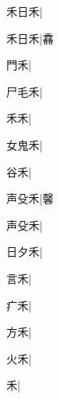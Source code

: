 \begin{multicols}{2}
{{\cjk{}禾日禾}\mktsJzrVerticalBar{}{\cjk{}{\cnsym{}　}{\cnsym{}　}{\cnsym{}　}}|{}\par
{\cjk{}禾日禾}|{\cjk{}馫}\par
{\cjk{}{\cnsym{}　}門禾}\mktsJzrVerticalBar{}{\cjk{}{\cnsym{}　}{\cnsym{}　}{\cnsym{}　}}|{}\par
{\cjk{}尸毛禾}\mktsJzrVerticalBar{}{\cjk{}{\cnsym{}　}{\cnsym{}　}{\cnsym{}　}}|{}\par
{\cjk{}{\cnsym{}　}禾禾}\mktsJzrVerticalBar{}{\cjk{}{\cnsym{}　}{\cnsym{}　}{\cnsym{}　}}|{}\par
{\cjk{}女鬼禾}|{}\par
{\cjk{}{\cnsym{}　}谷禾}\mktsJzrVerticalBar{}{\cjk{}{\cnsym{}　}{\cnsym{}　}{\cnsym{}　}}|{}\par
{\cjk{}声殳禾}\mktsJzrVerticalBar{}{\cjk{}{\cnsym{}　}{\cnsym{}　}{\cnsym{}　}}|{\cjk{}馨}\par
{\cjk{}声殳禾}|{}\par
{\cjk{}日夕禾}|{}\par
{\cjk{}{\cnsym{}　}言禾}\mktsJzrVerticalBar{}{\cjk{}{\cnsym{}　}{\cnsym{}　}{\cnsym{}　}}|{}\par
{\cjk{}{\cnsym{}　}疒禾}\mktsJzrVerticalBar{}{\cjk{}{\cnsym{}　}{\cnsym{}　}{\cnsym{}　}}|{}\par
{方禾}\mktsJzrVerticalBar{}{\cjk{}{\cnsym{}　}{\cnsym{}　}{\cnsym{}　}}|{}\par
{\cjk{}{\cnsym{}　}火禾}\mktsJzrVerticalBar{}{\cjk{}{\cnsym{}　}{\cnsym{}　}{\cnsym{}　}}|{}\par
{禾}\mktsJzrVerticalBar{}{\cjk{}{\cnsym{}　}{\cnsym{}　}{\cnsym{}　}}|{}\par
}
\end{multicols}
